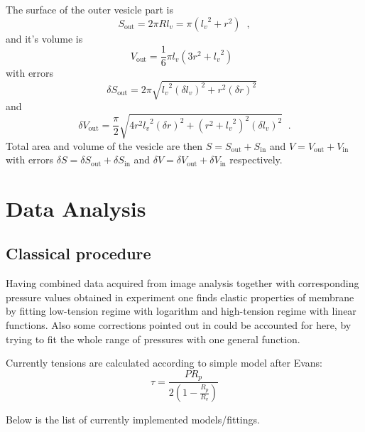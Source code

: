 The surface of the outer vesicle part is
\begin{equation*}
S_\text{out} = 2\pi Rl_v = \pi \left({l_v}^2+r^2\right)\;\;,
\end{equation*}
and it's volume is
\begin{equation*}
V_\text{out} = \frac{1}{6}\pi l_v\left(3r^2+{l_v}^2\right)\;\;
\end{equation*}
with errors
\begin{equation*}
\delta S_\text{out} = 2\pi\sqrt{{l_v}^2 \left(\delta l_v\right)^2 + r^2 \left( \delta r\right) ^2}\;\;
\end{equation*}
and
\begin{equation*}
\delta V_\text{out} = \frac{\pi}{2} \sqrt{4 r^2 {l_v}^2\left(\delta r\right)^2 + \left(r^2+{l_v}^2\right)^2 \left(\delta l_v\right)^2}\;\;.
\end{equation*}
Total area and volume of the vesicle are then $S = S_\text{out}+S_\text{in}$ and $V = V_\text{out}+V_\text{in}$ with errors $\delta S = \delta S_\text{out} + \delta S_\text{in}$ and $\delta V = \delta V_\text{out} + \delta V_\text{in}$ respectively.

\section{Data Analysis}\label{analysis}
\subsection{Classical procedure}
Having combined data acquired from image analysis together with corresponding pressure values obtained in experiment one finds elastic properties of membrane by fitting low-tension regime with logarithm and high-tension regime with linear functions. Also some corrections pointed out in \cite{Henriksen2004, Fournier2001} could be accounted for here, by trying to fit the whole range of pressures with one general function.

Currently tensions are calculated according to simple model after Evans:
\begin{equation}
\tau = \frac{P R_p}{2\left(1-\frac{R_p}{R_v}\right)}
\label{eq:tau-evans}
\end{equation}

Below is the list of currently implemented models/fittings.

